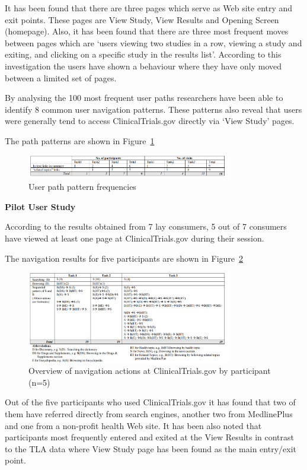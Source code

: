 \documentclass[]{article}
\begin{document}
It has been found that there are three pages which serve as Web site entry and exit points. These pages are View Study, View Results and Opening Screen (homepage). Also, it has been found that there are three most frequent moves between pages which are ‘users viewing two studies in a row, viewing a study and exiting, and clicking on a specific study in the results list’. According to this investigation the users have shown a behaviour where they have only moved between a limited set of pages.
      
By analysing the 100 most frequent user paths researchers have been able to identify 8 common user navigation patterns. These patterns also reveal that users were generally tend to access ClinicalTrials.gov directly via ‘View Study’ pages. 
    
The path patterns are shown in Figure~\ref{fig21}

\begin{figure}[b!]
	\includegraphics[width=0.8\textwidth]{Capture21.png}
	\caption{ User path pattern frequencies \label{fig21}}
\end{figure}

\textbf{Pilot User Study}

According to the results obtained from 7 lay consumers, 5 out of 7 consumers have viewed at least one page at ClinicalTrials.gov during their session.  

The navigation results for five participants are shown in Figure~\ref{fig22}

\begin{figure}[t!]
	\includegraphics[width=0.8\textwidth]{Capture22.png}
	\caption{Overview of navigation actions at ClinicalTrials.gov by participant (n=5)  \label{fig22}}
\end{figure}

Out of the five participants who used ClinicalTrials.gov it has found that two of them have referred directly from search engines, another two from MedlinePlus and one from a non-profit health Web site. It has been also noted that participants most frequently entered and exited at the View Results in contrast to the TLA data where View Study page has been found as the main entry/exit point. 
  
\end{document}
